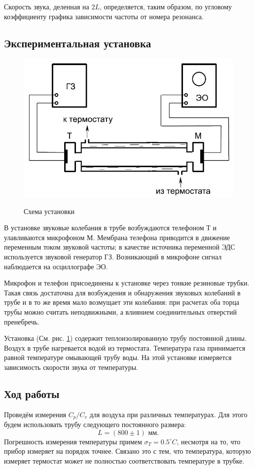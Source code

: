 \documentclass[12pt,a4paper]{article}
\newcommand{\figref}[1]{(См. рис. \ref{#1})}
\begin{document}
Скорость звука, деленная на $2L$, определяется, таким образом, по угловому коэффициенту графика зависимости частоты от номера резонанса.


\subsection*{Экспериментальная установка}

\begin{figure}[h]
	\caption{Схема установки}
	\includegraphics[scale=0.65]{res/scheme2.jpg}
	\label{scheme2}
\end{figure}

В установке звуковые колебания в трубе возбуждаются телефоном Т и улавливаются микрофоном М.
Мембрана телефона приводится в движение переменным током звуковой частоты; в качестве источника переменной ЭДС используется звуковой генератор ГЗ.
Возникающий в микрофоне сигнал наблюдается на осциллографе ЭО.

Микрофон и телефон присоединены к установке через тонкие резиновые трубки.
Такая связь достаточна для возбуждения и обнаружения звуковых колебаний в трубе и в то же время мало возмущает эти колебания: при расчетах оба торца трубы можно считать неподвижными, а влиянием соединительных отверстий пренебречь.

Установка \figref{scheme2} содержит теплоизолированную трубу постоянной длины.
Воздух в трубе нагревается водой из термостата.
Температура газа принимается равной температуре омывающей трубу воды.
На этой установке измеряется зависимость скорости звука от температуры.




\subsection*{Ход работы}
Проведём измерения $C_p/C_v$ для воздуха при различных температурах.
Для этого будем использовать трубу следующего постоянного размера:
$$L = (800 \pm 1) \text{ мм}.$$
Погрешность измерения температуры примем $\sigma_T = 0.5^\circ C$, несмотря на то, что прибор измеряет на порядок точнее. Связано это с тем, что температура, которую измеряет термостат может не полностью соответствовать температуре в трубке. 
\end{document}
